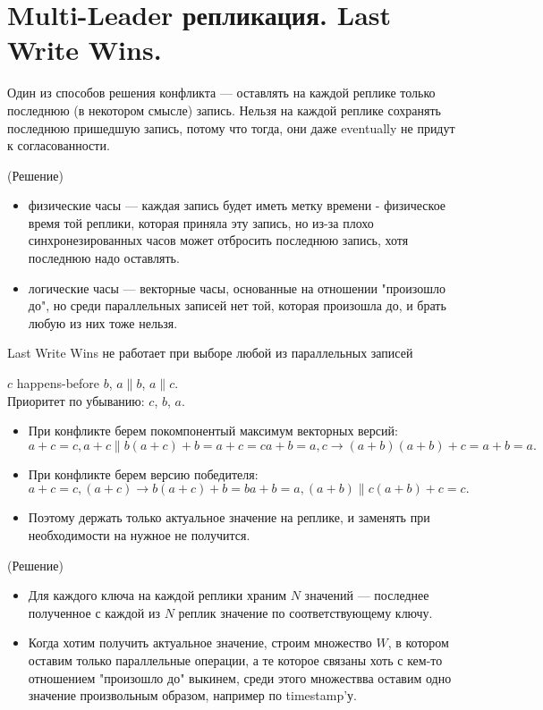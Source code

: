 \section{Multi-Leader репликация. Last Write Wins.}
    Один из способов решения конфликта --- оставлять на каждой реплике только последнюю (в некотором смысле) запись. Нельзя на каждой реплике сохранять последнюю пришедшую запись, потому что тогда, они даже eventually не придут к согласованности. \\
    \begin{algorithm}(Решение)
    \begin{itemize}
        \item физические часы --- каждая запись будет иметь метку времени - физическое время той реплики, которая приняла эту запись, но из-за плохо синхронезированных часов может отбросить последнюю запись, хотя последнюю надо оставлять.
        \item логические часы --- векторные часы, основанные на отношении "произошло до", но среди параллельных записей нет той, которая произошла до, и брать любую из них тоже нельзя.
    \end{itemize}
    \end{algorithm}
      \begin{definition}
        Last Write Wins не работает при выборе любой из параллельных записей
      \end{definition}
          $c$ happens-before $b$, $a \parallel b$, $a \parallel c$. \\
          Приоритет по убыванию: $c$, $b$, $a$. \\
          \begin{itemize}
          \item При конфликте берем покомпонентый максимум векторных версий:
          \[
            a + c = c, a + c \parallel b
            (a + c) + b = a + c = c
            a + b = a, c \rightarrow (a + b)
            (a + b) + c = a + b = a
          .\]
          \item При конфликте берем версию победителя:
          \[
            a + c = c, (a + c) \rightarrow b
            (a + c) + b = b
            a + b = a, (a + b) \parallel c
            (a + b) + c = c
          .\]
         \item Поэтому держать только актуальное значение на реплике, и заменять при необходимости на нужное не получится.
        \end{itemize}
        \begin{algorithm}(Решение)
          \begin{itemize}
            \item Для каждого ключа на каждой реплики храним $N$ значений --- последнее полученное с каждой из $N$ реплик значение по соответствующему ключу.
            \item Когда хотим получить актуальное значение, строим множество $W$, в котором оставим только параллельные операции, а те которое связаны хоть с кем-то отношением "произошло до" выкинем, среди этого множествва оставим одно значение произвольным образом, например по timestamp'у.
          \end{itemize}
        \end{algorithm}
